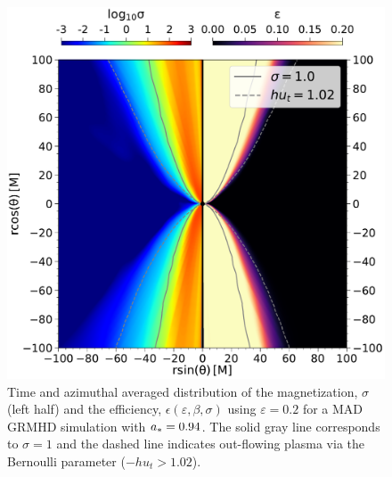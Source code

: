 
\begin{figure}[t!]
  \centering
  \includegraphics[width=\columnwidth]{./figures/GRMHDphiavera0.94sigmaeta.pdf}
  \caption{Time and azimuthal averaged distribution of the magnetization, $\sigma$ (left half) and the efficiency, $\epsilon(\varepsilon,\beta,\sigma)$ using $\varepsilon=0.2 $ for a \bhac MAD GRMHD simulation with $a_*=0.94$. The solid gray line corresponds to $\sigma=1$ and the dashed line indicates out-flowing plasma via the Bernoulli parameter ($-h u_{t}>1.02$).
  }
  \label{fig:varepsilon}
\end{figure}


